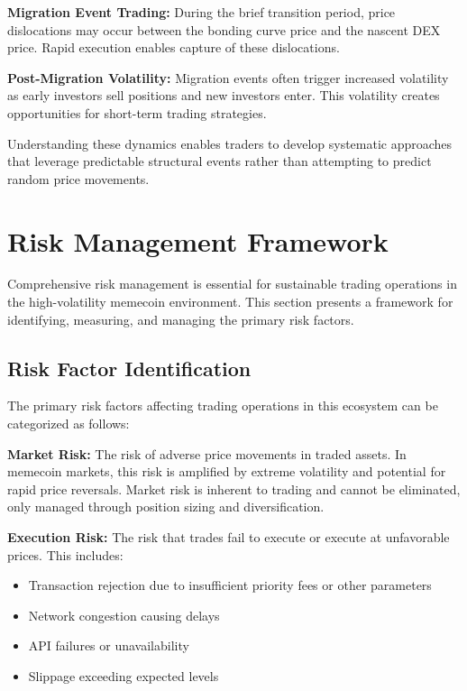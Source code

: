 \documentclass[12pt,a4paper]{article}
\begin{document}
\textbf{Migration Event Trading:} During the brief transition period, price dislocations may occur between the bonding curve price and the nascent DEX price. Rapid execution enables capture of these dislocations.

\textbf{Post-Migration Volatility:} Migration events often trigger increased volatility as early investors sell positions and new investors enter. This volatility creates opportunities for short-term trading strategies.

Understanding these dynamics enables traders to develop systematic approaches that leverage predictable structural events rather than attempting to predict random price movements.

\section{Risk Management Framework}

Comprehensive risk management is essential for sustainable trading operations in the high-volatility memecoin environment. This section presents a framework for identifying, measuring, and managing the primary risk factors.

\subsection{Risk Factor Identification}

The primary risk factors affecting trading operations in this ecosystem can be categorized as follows:

\textbf{Market Risk:} The risk of adverse price movements in traded assets. In memecoin markets, this risk is amplified by extreme volatility and potential for rapid price reversals. Market risk is inherent to trading and cannot be eliminated, only managed through position sizing and diversification.

\textbf{Execution Risk:} The risk that trades fail to execute or execute at unfavorable prices. This includes:
\begin{itemize}
\item Transaction rejection due to insufficient priority fees or other parameters
\item Network congestion causing delays
\item API failures or unavailability
\item Slippage exceeding expected levels
\end{itemize}
\end{document}
